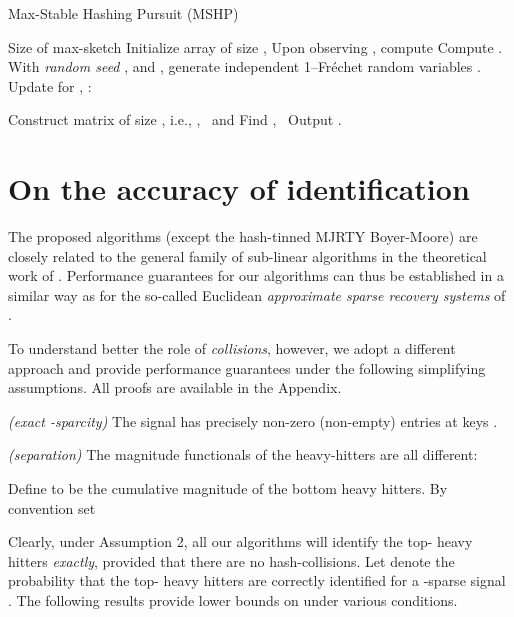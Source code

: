\documentclass[10pt, conference, letterpaper,onecolumn]{IEEEtranv1.8}
\theoremstyle{plain}\newtheorem{thm}{Theorem}\newtheorem{lem}{Lemma}
\theoremstyle{definition}
\begin{document}
\begin{algorithm}[t]
\caption{Max-Stable Hashing Pursuit (MSHP)}
\label{alg:mshp}
\begin{algorithmic}[1]
\REQUIRE Size of max-sketch 
\STATE [Start]    Initialize array  of size ,
\STATE [Permute]  Upon observing , compute 
\STATE [Hash]  Compute .
\STATE [RNG]  With \emph{random seed} , and , generate  independent 1--Fr\'echet random variables .
\STATE [Update]    Update  for , :
   
 \vspace{-10pt}  
   \STATE Construct matrix  of size , i.e.,
   \STATE , \  and  
   \STATE Find , \  
 \STATE [Decode]  Output . 
 \ENDIF    
\end{algorithmic}
\end{algorithm} 
  
  
  
  






\section{On the accuracy of identification}
\label{sec:bounds}

 The proposed algorithms (except the hash-tinned MJRTY Boyer-Moore) are closely related to the general family 
 of sub-linear algorithms in the theoretical work of \cite{Porat:2012:STM:2095116.2095212}. Performance guarantees 
 for our algorithms can thus be established in a similar way as for the so-called Euclidean 
 {\em approximate sparse recovery systems} of  \cite{doi:10.1137/100816705}.  

To understand better the role of {\em collisions}, however, we adopt a different approach and provide 
performance guarantees under the following simplifying assumptions.  All  proofs are available in the 
Appendix.

\smallskip
{} {\em (exact -sparcity)} The signal  has precisely  non-zero (non-empty) entries
at keys .

\smallskip
{} {\em (separation)} The magnitude functionals  
of the heavy-hitters are all different:

Define  to be the cumulative magnitude of the bottom  heavy hitters. By convention
set 



\smallskip
  Clearly, under Assumption 2, all our algorithms will identify 
 the top- heavy hitters {\em exactly}, provided that there are no hash-collisions. Let  denote the 
 probability that the top- heavy hitters are correctly identified for a -sparse signal . The following 
 results provide lower bounds on  under various conditions.
\end{document}
